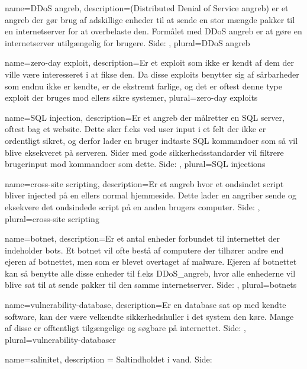 \makeglossaries

{
    name={DDoS angreb},
    description={(Distributed Denial of Service angreb) er et angreb der gør brug af adskillige enheder til at sende en stor mængde pakker til en internetserver for at overbelaste den. Formålet med DDoS angreb er at gøre en internetserver utilgængelig for brugere.  Side: },
    plural={DDoS angreb}
}

{
    name={zero-day exploit},
    description={Er et exploit som ikke er kendt af dem der ville være interesseret i at fikse den. Da disse exploits benytter sig af sårbarheder som endnu ikke er kendte, er de ekstremt farlige, og det er oftest denne type exploit der bruges mod ellers sikre systemer},
    plural={zero-day exploits}
}

{
    name={SQL injection},
    description={Er et angreb der målretter en SQL server, oftest bag et website. Dette sker f.eks ved user input i et felt der ikke er ordentligt sikret, og derfor lader en bruger indtaste SQL kommandoer som så vil blive eksekveret på serveren. Sider med gode sikkerhedsstandarder vil filtrere brugerinput mod kommandoer som dette.  Side: },
    plural={SQL injections}
}

{
    name={cross-site scripting},
    description={Er et angreb hvor et ondsindet script bliver injected på en ellers normal hjemmeside. Dette lader en angriber sende og eksekvere det ondsindede script på en anden brugers computer. Side: },
    plural={cross-site scripting}
}

{
    name={botnet},
    description={Er et antal enheder forbundet til internettet der indeholder bots. Et botnet vil ofte bestå af computere der tilhører andre end ejeren af botnettet, men som er blevet overtaget af malware. Ejeren af botnettet kan så benytte alle disse enheder til f.eks \Gls{DDoS_angreb}, hvor alle enhederne vil blive sat til at sende pakker til den samme internetserver. Side: }, 
    plural={botnets}
}

{
    name={vulnerability-database},
    description={Er en database sat op med kendte software, kan der være velkendte sikkerhedshuller i det system den køre. Mange af disse er offtentligt tilgængelige og søgbare på internettet.  Side: }, 
    plural={vulnerability-databaser}
}

{
    name={salinitet},
    description = {Saltindholdet i vand. Side: }
}

